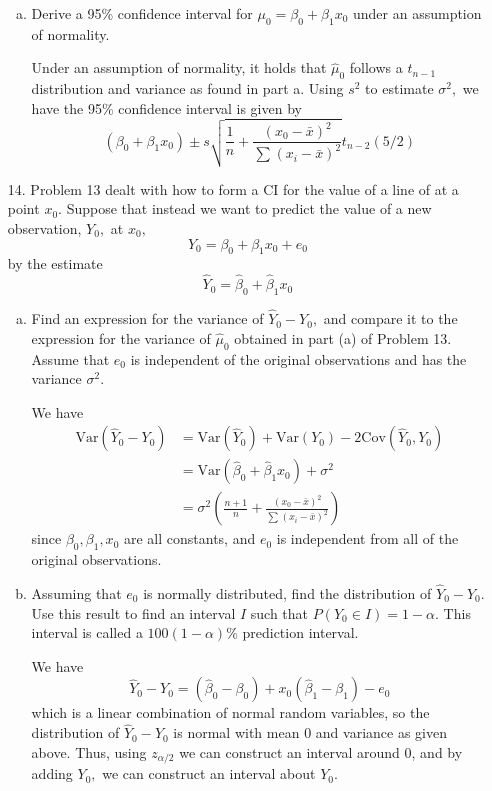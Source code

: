 \documentclass{article}
\newcommand{\var}{\mathrm{Var}}
\newcommand{\cov}{\mathrm{Cov}}
\begin{document}
\begin{itemize}
\begin{enumerate}[a.]
			\item Derive a 95\% confidence interval for $\mu_0=\beta_0+\beta_1x_0$ under an assumption of normality.
				\begin{soln}
					Under an assumption of normality, it holds that $\hat\mu_0$ follows a $t_{n-1}$ distribution and variance as found in part a. Using $s^2$ to estimate $\sigma^2,$ we have the 95\% confidence interval is given by
					\[(\beta_0+\beta_1x_0) \pm s\sqrt{\frac{1}{n} + \frac{(x_0-\bar x)^2}{\sum_{}^{}(x_i-\bar x)^2}} t_{n-2}(5/2)\]
				\end{soln}
				
		\end{enumerate}
			
	\item[14.] Problem 13 dealt with how to form a CI for the value of a line of at a point $x_0.$ Suppose that instead we want to predict the value of a new observation, $Y_0,$ at $x_0,$ \[Y_0=\beta_0+\beta_1x_0+e_0\] by the estimate \[\hat Y_0=\hat\beta_0+\hat\beta_1x_0\]
		\begin{enumerate}[a.]
			\item Find an expression for the variance of $\hat Y_0-Y_0,$ and compare it to the expression for the variance of $\hat\mu_0$ obtained in part (a) of Problem 13. Assume that $e_0$ is independent of the original observations and has the variance $\sigma^2.$
				\begin{soln}
					We have
					\begin{align*}
						\var(\hat Y_0-Y_0) &= \var(\hat Y_0) +\var(Y_0) - 2\cov(\hat Y_0, Y_0) \\
						&=\var(\hat\beta_0+\hat\beta_1 x_0) + \sigma^2 \\
						&= \sigma^2 \left( \frac{n+1}{n} + \frac{(x_0-\bar x)^2}{\sum_{}^{}(x_i-\bar x)^2}\right)
					\end{align*}
					since $\beta_0, \beta_1, x_0$ are all constants, and $e_0$ is independent from all of the original observations.
				\end{soln}

			\item Assuming that $e_0$ is normally distributed, find the distribution of $\hat Y_0-Y_0.$ Use this result to find an interval $I$ such that $P(Y_0\in I)=1-\alpha.$ This interval is called a $100(1-\alpha)\%$ prediction interval.
				\begin{soln}
					We have \[\hat Y_0-Y_0=(\hat\beta_0-\beta_0) + x_0(\hat\beta_1-\beta_1)-e_0\] which is a linear combination of normal random variables, so the distribution of $\hat Y_0-Y_0$ is normal with mean 0 and variance as given above. Thus, using $z_{\alpha/2}$ we can construct an interval around 0, and by adding $Y_0,$ we can construct an interval about $Y_0.$
				\end{soln}
				

\end{enumerate}
\end{itemize}
\end{document}
